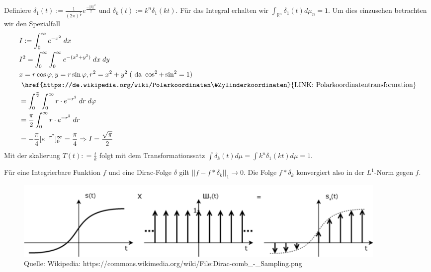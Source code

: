 \begin{Beispiel}
\label{Diracfolgeb}
Definiere $\delta_1 (t) := \frac{1}{(2 \pi)^{\frac{n}{2}}} e^{ \frac{ - || t ||^2}{2}}$ und $\delta_k(t) := k^n \delta_1(k t)$.  
Für das Integral erhalten wir $\int_{\mathbb{R}^n} \delta_1 (t)  d \mu_n = 1$. Um dies einzusehen betrachten wir den Spezialfall
\begin{align*}
& I := \int_{0}^{\infty} e^{-x^2} \; dx\\
& I^2 = \int_{0}^{\infty} \int_{0}^{\infty} e^{-(x^2+y^2)} \; dx \;dy \\
&x=r \cos \varphi ,y=r\sin \varphi ,r^2 = x^2 + y^2  \; (\text{ da } \cos^2 + \sin^2 = 1)\\
 &\text{ \href{https://de.wikipedia.org/wiki/Polarkoordinaten\#Zylinderkoordinaten}{LINK: Polarkoordinatentransformation}} \\
& = \int_{0}^{\frac{\pi}{2}}  \int_{0}^{\infty}r \cdot e^{-r^2} \; dr \;d\varphi \\
&= \frac{\pi}{2} \int_{0}^{\infty}r \cdot e^{-r^2} \; dr \\
&= -\frac{\pi}{4} [e^{-r^2} ]_0^{\infty} = \frac{\pi}{4} \Rightarrow I = \frac{\sqrt{\pi}}{2}
\end{align*}
Mit der skalierung $T(t) : = \frac{t}{k}$ folgt mit dem Transformationssatz $\int \delta_k (t) d \mu = \int  k^n \delta_1(k t) d \mu = 1$.
\end{Beispiel}

\begin{Satz}
Für eine Integrierbare Funktion $f$ und eine Dirac-Folge $\delta$ gilt $|| f -  f *\delta_k ||_1 \to 0 $. Die Folge  $f *\delta_k$ konvergiert also in der $L^1$-Norm gegen $f$.
\end{Satz}
\begin{figure}[H]
      \centering
    \includegraphics[width=0.9\textwidth]{images/640px-Dirac-comb_-_Sampling}
\caption{Quelle: Wikipedia: https://commons.wikimedia.org/wiki/File:Dirac-comb\_-\_Sampling.png}
\end{figure}



